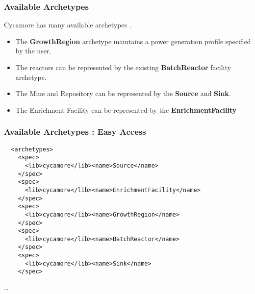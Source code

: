 


\begin{frame}[fragile]
  \frametitle{Available Archetypes}
  Cycamore has many available archetypes \cite{carlsen_cycamore_2014}.
  \begin{itemize}
\item The \textbf{GrowthRegion} archetype maintains a power generation profile specified by the user. 
\item The reactors can be represented by the existing \textbf{BatchReactor} 
facility archetype.
\item The Mine and Repository can be represented by the \textbf{Source} and 
\textbf{Sink}.
\item The Enrichment Facility can be represented by the \textbf{EnrichmentFacility}
\end{itemize}
\end{frame}

\begin{frame}[fragile]
  \frametitle{Available Archetypes : Easy Access}
\footnotesize{
\begin{lstlisting}
  <archetypes>
    <spec>
      <lib>cycamore</lib><name>Source</name>
    </spec>
    <spec>
      <lib>cycamore</lib><name>EnrichmentFacility</name>
    </spec>
    <spec>
      <lib>cycamore</lib><name>GrowthRegion</name>
    </spec>
    <spec>
      <lib>cycamore</lib><name>BatchReactor</name>
    </spec>
    <spec>
      <lib>cycamore</lib><name>Sink</name>
    </spec>
\end{lstlisting}
\ldots
}
\end{frame}

